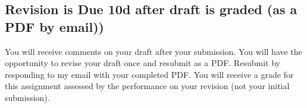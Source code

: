 \documentclass[12pt]{article}
\begin{document}
\subsection*{Revision is Due 10d after draft is graded (as a PDF by email))}

You will receive comments on your draft after your submission. You will have the opportunity to revise your draft once and resubmit as a PDF. Resubmit by responding to my email with your completed PDF. You will receive a grade for this assignment assessed by the performance on your revision (not your initial submission).

\end{document}
